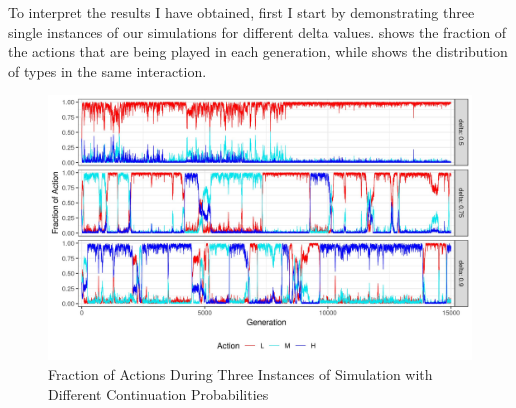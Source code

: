 \documentclass[12pt]{article}
\begin{document}
To interpret the results I have obtained, first I start by demonstrating three single instances of our simulations for different delta values.  shows the fraction of the actions that are being played in each generation, while  shows the distribution of types in the same interaction.   
\begin{figure}[H]
	\centering
	\includegraphics[width=1\linewidth]{img/actions_singlerun2}
	\caption[Fraction of Actions During Three Instances]{Fraction of Actions During Three Instances of Simulation with Different Continuation Probabilities}
	\label{fig:evo-actionssingle}
\end{figure}
\end{document}
